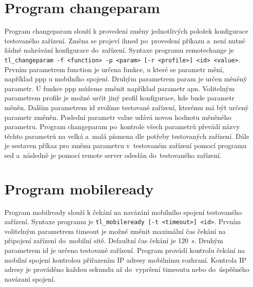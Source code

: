 \section{Program changeparam}
Program changeparam slouží k provedení změny jednotlivých položek konfigurace testovaného zařízení. Změna se projeví ihned po~provedení příkazu a~není nutné žádné nahrávání konfigurace do~zařízení. Syntaxe programu remotechange je \texttt{tl\_changeparam -f <function> -p <param> [-r <profile>] <id> <value>}. Prvním parametrem function je určena funkce, u které se parametr mění, například ppp u mobilního spojení. Druhým parametrem param je určen měněný parametr. U funkce ppp můžeme změnit například parametr apn. Volitelným parametrem profile je možné určit jiný profil konfigurace, kde bude parametr měněn. Dalším parametrem id zvolíme testované zařízení, kterému má být určený parametr změněn. Poslední parametr value udává novou hodnotu měněného parametru. Program changeparam po~kontrole všech parametrů převádí názvy těchto parametrů na velká a~malá písmena dle potřeby testovaných zařízení. Dále je sestaven příkaz pro změnu parametru v~testovaném zařízení pomocí programu sed a~následně je pomocí remote server odeslán do~testovaného zařízení.

\section{Program mobileready}
Program mobilready slouží k čekání na navázání mobilního spojení testovaného zařízení. Syntaxe programu je \texttt{tl\_mobileready [-t <timeout>] <id>}. Prvním volitelným parametrem timeout je možné změnit maximální čas čekání na připojení zařízení do~mobilní sítě. Defaultní čas čekání je 120~s. Druhým parametrem id je určeno testované zařízení. Program provádí kontrolu čekání na mobilní spojení kontrolou přiřazením IP adresy mobilnímu rozhraní. Kontrola IP adresy je prováděno každou sekundu až do~vypršení timeoutu nebo do~úspěšného navázaní spojení.
\endinput
